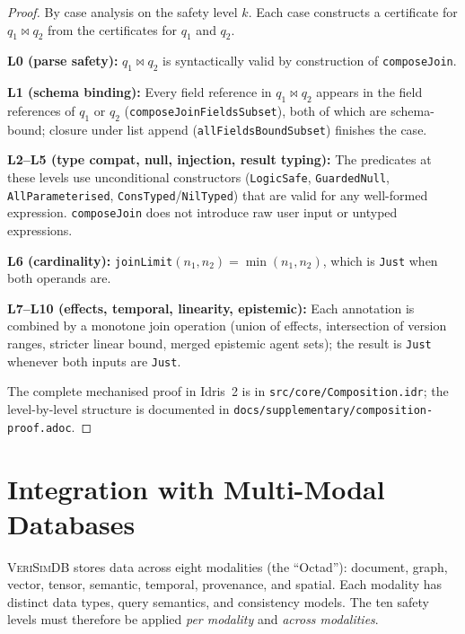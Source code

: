 \documentclass[11pt,a4paper]{article}
\newcommand{\VeriSimDB}{\textsc{VeriSimDB}}
\begin{document}
\begin{proof}
By case analysis on the safety level $k$.  Each case constructs a
certificate for $q_1 \bowtie q_2$ from the certificates for $q_1$ and $q_2$.

\textbf{L0 (parse safety):} $q_1 \bowtie q_2$ is syntactically valid by
construction of \texttt{composeJoin}.

\textbf{L1 (schema binding):} Every field reference in $q_1 \bowtie q_2$
appears in the field references of $q_1$ or $q_2$ (\texttt{composeJoinFieldsSubset}),
both of which are schema-bound; closure under list append
(\texttt{allFieldsBoundSubset}) finishes the case.

\textbf{L2--L5 (type compat, null, injection, result typing):}
The predicates at these levels use unconditional constructors
(\texttt{LogicSafe}, \texttt{GuardedNull}, \texttt{AllParameterised},
\texttt{ConsTyped}/\texttt{NilTyped}) that are valid for any well-formed
expression.  \texttt{composeJoin} does not introduce raw user input or
untyped expressions.

\textbf{L6 (cardinality):} \texttt{joinLimit}$(n_1, n_2) = \min(n_1, n_2)$,
which is \texttt{Just} when both operands are.

\textbf{L7--L10 (effects, temporal, linearity, epistemic):} Each annotation
is combined by a monotone join operation (union of effects, intersection of
version ranges, stricter linear bound, merged epistemic agent sets); the
result is \texttt{Just} whenever both inputs are \texttt{Just}.

The complete mechanised proof in Idris~2 is in
\texttt{src/core/Composition.idr}; the level-by-level structure is
documented in \texttt{docs/supplementary/composition-proof.adoc}.
\end{proof}

\section{Integration with Multi-Modal Databases}\label{sec:multimodal}

\VeriSimDB{} stores data across eight modalities (the ``Octad''):
document, graph, vector, tensor, semantic, temporal, provenance, and
spatial.  Each modality has distinct data types, query semantics, and
consistency models.  The ten safety levels must therefore be applied
\emph{per modality} and \emph{across modalities}.
\end{document}
